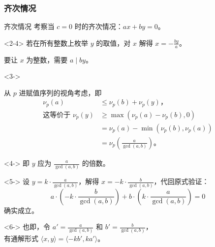 \documentclass{../pkslide}
\begin{document}

\subsubsection{齐次情况}


\begin{frame}{齐次情况}
  考察当 $c = 0$ 时的齐次情况：$a x + b y = 0$。
  
  \begin{onlyenv}<2-4>
    若在所有整数上枚举 $y$ 的取值，对 $x$ 解得 $x = -\frac{b y}{a}$。
    
    要让 $x$ 为整数，需要 $a \mid b y$。
    
    \begin{visibleenv}<3->
      \emptyline
      
      从 $p$ 进赋值序列的视角考虑，即%
      \begin{align*}
        \nu_p(a) & \le \nu_p(b) + \nu_p(y)\text{，} \\
        \text{这等价于\ } \nu_p(y) & \ge \max(\nu_p(a) - \nu_p(b), 0) \\
        & = \nu_p(a) - \min(\nu_p(b), \nu_p(a)) \\
        & = \nu_p \!\left( \tfrac{a}{\gcd(a, b)} \right)\! \text{。}
      \end{align*}%
    \end{visibleenv}%
    \begin{visibleenv}<4->
      即 $y$ 应为 $\frac{a}{\gcd(a, b)}$ 的倍数。
    \end{visibleenv}
  \end{onlyenv}
  
  \begin{onlyenv}<5->
    设 $y = k \cdot \frac{a}{\gcd(a, b)}$，解得 $x = -k \cdot \frac{b}{\gcd(a, b)}$，代回原式验证：%
    \[
      a \cdot \!\left( -k \cdot \frac{b}{\gcd(a, b)} \right)\! + b \cdot \!\left( k \cdot \frac{a}{\gcd(a, b)} \right) = 0
    \]%
    确实成立。
    
    \emptyline
    
    \begin{visibleenv}<6->
      也即，令 $a' = \frac{a}{\gcd(a, b)}$ 和 $b' = \frac{b}{\gcd(a, b)}$，\\
      \-\hspace{3em}有通解形式 $\langle x, y \rangle = \langle -k b', k a' \rangle$。
    \end{visibleenv}
  \end{onlyenv}
\end{frame}
\end{document}
